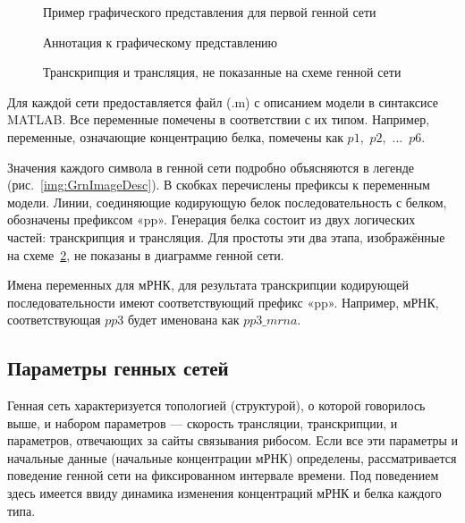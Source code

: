 \begin{figure}[h]
  \caption{Пример графического представления для первой генной сети}
  \label{img:GrnImage}
\end{figure}

\begin{figure}[h]
  \begin{minipage}[h]{0.34\linewidth}
    \caption{Аннотация к графическому представлению}
    \label{img:GrnImageDesc}
  \end{minipage}
  \hfill
  \begin{minipage}[h]{0.64\linewidth}
    \caption{Транскрипция и трансляция, не показанные на схеме генной сети}
    \label{img:GrnImageTT}
  \end{minipage}
\end{figure}

Для каждой сети предоставляется файл (.m) с описанием модели в 
синтаксисе MATLAB. Все переменные помечены в соответствии с их типом. 
Например, переменные, означающие концентрацию белка, помечены как 
$p1$,~$p2$,~...~$p6$. 

Значения каждого символа в генной сети подробно 
объясняются в легенде (рис.~\ref{img:GrnImageDesc}). В скобках перечислены 
префиксы к переменным модели. Линии, соединяющие кодирующую белок 
последовательность с белком, обозначены префиксом «pp». Генерация белка состоит 
из двух логических частей: транскрипция и трансляция. Для простоты эти два 
этапа, изображённые на схеме~\ref{img:GrnImageTT}, не показаны в диаграмме 
генной сети. 

Имена переменных для мРНК, для результата транскрипции кодирующей 
последовательности имеют соответствующий префикс «pp». Например, мРНК, 
соответствующая $pp3$ будет именована как $pp3\_mrna$.

\subsection{Параметры генных сетей} \label{s2_3}

Генная сеть характеризуется топологией (структурой), о которой говорилось выше, 
и набором параметров — скорость трансляции, транскрипции, и параметров, 
отвечающих за сайты связывания рибосом. Если все эти параметры и начальные 
данные (начальные концентрации мРНК) определены, рассматривается поведение 
генной сети на фиксированном интервале времени. Под поведением здесь имеется 
ввиду динамика изменения концентраций мРНК и белка каждого типа.

